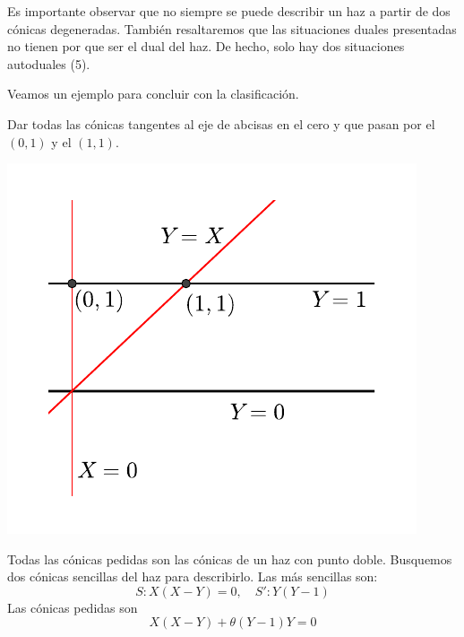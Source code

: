 \\

\\

\\

\\

\\

\\

\\

\\

\\

\\

Es importante observar que no siempre se puede describir un haz a partir de dos cónicas degeneradas. También resaltaremos que las situaciones duales presentadas no tienen por que ser el dual del haz. De hecho, solo hay dos situaciones autoduales (5).

Veamos un ejemplo para concluir con la clasificación.
\begin{exa}
	Dar todas las cónicas tangentes al eje de abcisas en el cero y que pasan por el $(0,1)$ y el $(1,1)$.
	\begin{center}
		\includegraphics[scale=.8]{Graficos/Conicas/EjemploHaz}
	\end{center}
	Todas las cónicas pedidas son las cónicas de un haz con punto doble. Busquemos dos cónicas sencillas del haz para describirlo. Las más sencillas son:
	\[S:X(X-Y)=0, \quad S':Y(Y-1)\]
	Las cónicas pedidas son
	\[X(X-Y)+\theta(Y-1)Y=0\]
\end{exa}

